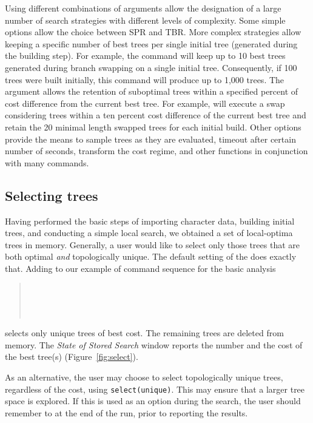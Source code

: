 {Using different combinations of  arguments allow the designation of a  large number of search 
strategies with different levels of complexity. Some simple options allow the choice between SPR and TBR. More 
complex strategies allow keeping a specific number of best trees per single initial tree (generated during the building step). 
For example, the command  will keep up to 10 best trees generated during branch swapping 
on a single initial tree. Consequently, if 100 trees were built initially, this command will produce up to 1,000 trees. The 
argument  allows the retention of suboptimal trees within a specified percent of cost difference 
from the current best tree. For example,  will execute a swap considering 
trees within a ten percent cost difference of the current best tree and retain the 20 minimal length swapped trees for each 
initial build. Other options provide the means to sample trees as they are evaluated, timeout after certain number of seconds, 
transform the cost regime, and other functions in conjunction with many \poy commands.

\subsection{Selecting trees}

Having performed the basic steps of importing character data, building initial trees, and conducting a simple local search, 
we obtained a set of local-optima trees in memory. Generally, a user would like to select only those trees that are 
both optimal \emph{and} topologically unique. The default setting of the  does exactly that. 
Adding  to our example of command sequence for the basic analysis 
\begin{quote}
\\
\\
\\
\end{quote}
selects only unique trees of best cost. The remaining trees are deleted from memory. The \emph{State of Stored Search} 
window reports the number and the cost of the best tree(s) (Figure~\ref{fig:select}).

As an alternative, the user may choose to select topologically unique trees, regardless of the cost, using 
\texttt{select(unique)}.  This may ensure that a larger tree space is explored.  If this is used as an option during the 
search, the user should remember to   at the end of the run, prior to reporting the results.

}
